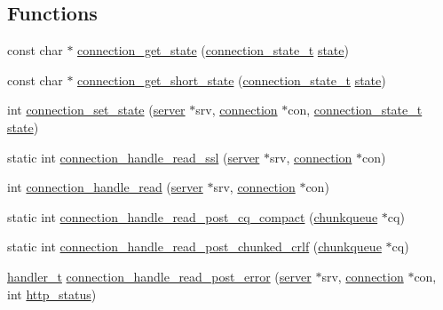 \subsection*{Functions}
\begin{DoxyCompactItemize}
\item 
const char $\ast$ \hyperlink{connections-glue_8c_aecc5e14b252546ad8a0b70416827b241}{connection\-\_\-get\-\_\-state} (\hyperlink{base_8h_a4a3875c10232b606f19a1e9f9d2a698a}{connection\-\_\-state\-\_\-t} \hyperlink{structstate}{state})
\item 
const char $\ast$ \hyperlink{connections-glue_8c_aa7a72c77a3b4ae4befbcd460592b26da}{connection\-\_\-get\-\_\-short\-\_\-state} (\hyperlink{base_8h_a4a3875c10232b606f19a1e9f9d2a698a}{connection\-\_\-state\-\_\-t} \hyperlink{structstate}{state})
\item 
int \hyperlink{connections-glue_8c_a911b2fc2c18deac454281071a8370148}{connection\-\_\-set\-\_\-state} (\hyperlink{structserver}{server} $\ast$srv, \hyperlink{structconnection}{connection} $\ast$con, \hyperlink{base_8h_a4a3875c10232b606f19a1e9f9d2a698a}{connection\-\_\-state\-\_\-t} \hyperlink{structstate}{state})
\item 
static int \hyperlink{connections-glue_8c_a8b94177538d263f1cc0b1623658ced2d}{connection\-\_\-handle\-\_\-read\-\_\-ssl} (\hyperlink{structserver}{server} $\ast$srv, \hyperlink{structconnection}{connection} $\ast$con)
\item 
int \hyperlink{connections-glue_8c_ae1be0fded1c8418f1f288a43394056e9}{connection\-\_\-handle\-\_\-read} (\hyperlink{structserver}{server} $\ast$srv, \hyperlink{structconnection}{connection} $\ast$con)
\item 
static int \hyperlink{connections-glue_8c_a88a7b9d35d370cde7600e01bb64b7ba7}{connection\-\_\-handle\-\_\-read\-\_\-post\-\_\-cq\-\_\-compact} (\hyperlink{structchunkqueue}{chunkqueue} $\ast$cq)
\item 
static int \hyperlink{connections-glue_8c_a3087df16271a2486f3c460b5897673c9}{connection\-\_\-handle\-\_\-read\-\_\-post\-\_\-chunked\-\_\-crlf} (\hyperlink{structchunkqueue}{chunkqueue} $\ast$cq)
\item 
\hyperlink{settings_8h_a2a8ffc3e29980db202f39ab85ab7e98e}{handler\-\_\-t} \hyperlink{connections-glue_8c_a17d0ce247758815fb8093f25640bebfa}{connection\-\_\-handle\-\_\-read\-\_\-post\-\_\-error} (\hyperlink{structserver}{server} $\ast$srv, \hyperlink{structconnection}{connection} $\ast$con, int \hyperlink{keyvalue_8c_ac8f113d23cb95a5a68052ef8dcee7ed9}{http\-\_\-status})

\end{DoxyCompactItemize}
